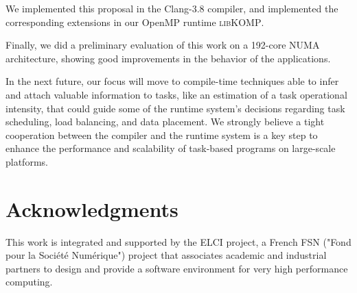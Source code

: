 \documentclass{Styles/llncs}
\newcommand{\libXKOMP}{\textsc{libKOMP}\xspace}
\begin{document}
We implemented this proposal in the Clang-3.8 compiler, and implemented the
corresponding extensions in our OpenMP runtime \libXKOMP.

Finally, we did a preliminary evaluation of this work on a 192-core NUMA architecture,
showing good improvements in the behavior of the applications.

In the next future, our focus will move to compile-time techniques able to infer and
attach valuable information to tasks, like an estimation of a task operational intensity,
that could guide some of the runtime system's decisions regarding task scheduling, load balancing, and data placement.
We strongly believe a tight cooperation between the compiler and the runtime system
is a key step to enhance the performance and scalability of task-based programs on large-scale platforms.


\section*{Acknowledgments}


This work is integrated and supported by the ELCI  project, a French FSN ("Fond pour la Société Numérique")
project that associates academic and industrial partners to design and provide a software environment for very high performance
computing.
  \small 

\end{document}

